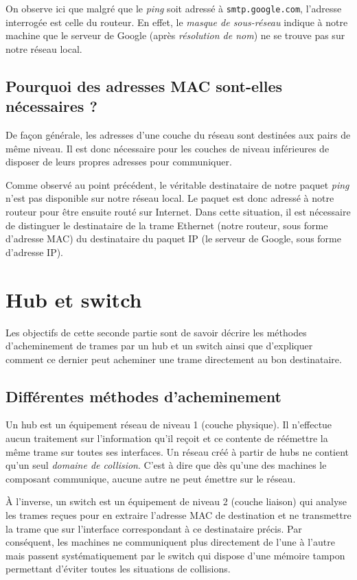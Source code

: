 \documentclass[11pt,a4paper]{article}
\begin{document}
On observe ici que malgré que le \textit{ping} soit adressé à \texttt{smtp.google.com}, l'adresse interrogée est celle du routeur. En effet, le \textit{masque de sous-réseau} indique à notre machine que le serveur de Google (après \textit{résolution de nom}) ne se trouve pas sur notre réseau local.

\subsection{Pourquoi des adresses MAC sont-elles nécessaires ?}

De façon générale, les adresses d'une couche du réseau sont destinées aux pairs de même niveau. Il est donc nécessaire pour les couches de niveau inférieures de disposer de leurs propres adresses pour communiquer.

Comme observé au point précédent, le véritable destinataire de notre paquet  \textit{ping} n'est pas disponible sur notre réseau local. Le paquet est donc adressé à notre routeur pour être ensuite routé sur Internet. Dans cette situation, il est nécessaire de distinguer le destinataire de la trame Ethernet (notre routeur, sous forme d'adresse MAC) du destinataire du paquet IP (le serveur de Google, sous forme d'adresse IP).

\section{Hub et switch}

Les objectifs de cette seconde partie sont de savoir décrire les méthodes d'acheminement de trames par un hub et un switch ainsi que d'expliquer comment ce dernier peut acheminer une trame directement au bon destinataire.

\subsection{Différentes méthodes d'acheminement}

Un hub est un équipement réseau de niveau 1 (couche physique). Il n'effectue aucun traitement sur l'information qu'il reçoit et ce contente de réémettre la même trame sur toutes ses interfaces. Un réseau créé à partir de hubs ne contient qu'un seul \textit{domaine de collision}. C'est à dire que dès qu'une des machines le composant communique, aucune autre ne peut émettre sur le réseau.

À l'inverse, un switch est un équipement de niveau 2 (couche liaison) qui analyse les trames reçues pour en extraire l'adresse MAC de destination et ne transmettre la trame que sur l'interface correspondant à ce destinataire précis. Par conséquent, les machines ne communiquent plus directement de l'une à l'autre mais passent systématiquement par le switch qui dispose d'une mémoire tampon permettant d'éviter toutes les situations de collisions.
\end{document}
